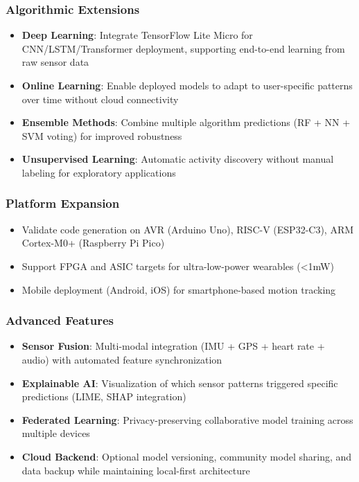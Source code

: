 \subsubsection{Algorithmic Extensions}
\begin{itemize}
    \item \textbf{Deep Learning}: Integrate TensorFlow Lite Micro for CNN/LSTM/Transformer deployment, supporting end-to-end learning from raw sensor data
    \item \textbf{Online Learning}: Enable deployed models to adapt to user-specific patterns over time without cloud connectivity
    \item \textbf{Ensemble Methods}: Combine multiple algorithm predictions (RF + NN + SVM voting) for improved robustness
    \item \textbf{Unsupervised Learning}: Automatic activity discovery without manual labeling for exploratory applications
\end{itemize}

\subsubsection{Platform Expansion}
\begin{itemize}
    \item Validate code generation on AVR (Arduino Uno), RISC-V (ESP32-C3), ARM Cortex-M0+ (Raspberry Pi Pico)
    \item Support FPGA and ASIC targets for ultra-low-power wearables (<1mW)
    \item Mobile deployment (Android, iOS) for smartphone-based motion tracking
\end{itemize}

\subsubsection{Advanced Features}
\begin{itemize}
    \item \textbf{Sensor Fusion}: Multi-modal integration (IMU + GPS + heart rate + audio) with automated feature synchronization
    \item \textbf{Explainable AI}: Visualization of which sensor patterns triggered specific predictions (LIME, SHAP integration)
    \item \textbf{Federated Learning}: Privacy-preserving collaborative model training across multiple devices
    \item \textbf{Cloud Backend}: Optional model versioning, community model sharing, and data backup while maintaining local-first architecture
\end{itemize}

